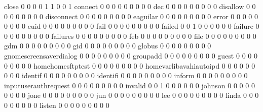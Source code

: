 \documentclass[compress,8pt]{beamer}
\begin{document}
\begin{frame}
\begin{Schunk}
  close                                      0   0   0   0   1   1   0   0   1
  connect                                    0   0   0   0   0   0   0   0   0
  dec                                        0   0   0   0   0   0   0   0   0
  disallow                                   0   0   0   0   0   0   0   0   0
  disconnect                                 0   0   0   0   0   0   0   0   0
  eaguilar                                   0   0   0   0   0   0   0   0   0
  error                                      0   0   0   0   0   0   0   0   0
  euid                                       0   0   0   0   0   0   0   0   0
  fail                                       0   0   0   0   0   0   0   0   0
  failed                                     0   0   1   0   0   0   0   0   0
  failure                                    0   0   0   0   0   0   0   0   0
  failures                                   0   0   0   0   0   0   0   0   0
  feb                                        0   0   0   0   0   0   0   0   0
  file                                       0   0   0   0   0   0   0   0   0
  gdm                                        0   0   0   0   0   0   0   0   0
  gid                                        0   0   0   0   0   0   0   0   0
  globus                                     0   0   0   0   0   0   0   0   0
  gnomescreensaverdialog                     0   0   0   0   0   0   0   0   0
  groupadd                                   0   0   0   0   0   0   0   0   0
  guest                                      0   0   0   0   0   0   0   0   0
  homehomesftptest                           0   0   0   0   0   0   0   0   0
  homevarlibavahiautoipd                     0   0   0   0   0   0   0   0   0
  identif                                    0   0   0   0   0   0   0   0   0
  identifi                                   0   0   0   0   0   0   0   0   0
  inform                                     0   0   0   0   0   0   0   0   0
  inputuserauthrequest                       0   0   0   0   0   0   0   0   0
  invalid                                    0   0   1   0   0   0   0   0   0
  johnson                                    0   0   0   0   0   0   0   0   0
  jone                                       0   0   0   0   0   0   0   0   0
  jun                                        0   0   0   0   0   0   0   0   0
  lee                                        0   0   0   0   0   0   0   0   0
  linda                                      0   0   0   0   0   0   0   0   0
  listen                                     0   0   0   0   0   0   0   0   0

\end{Schunk}
\end{frame}
\end{document}
